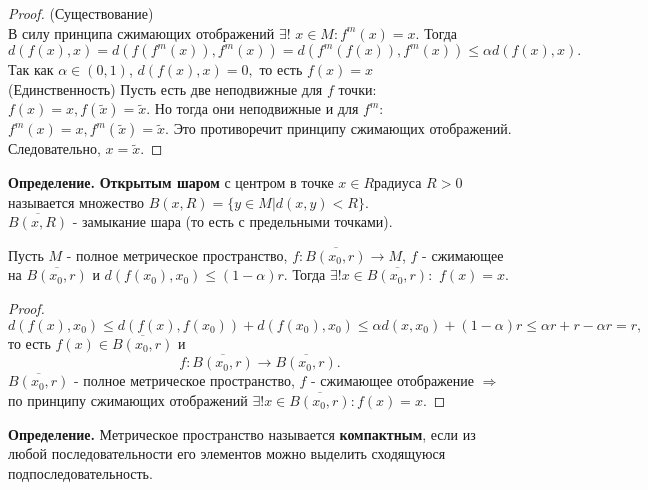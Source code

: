 \begin{proof}
    (Существование) \\
    В силу принципа сжимающих отображений $\exists!$ $x\in M:f^m(x)=x$. Тогда 
    \begin{equation*}
        d(f(x),x)=d(f(f^m(x)), f^m(x))=d(f^m(f(x)), f^m(x)) \leq \alpha d(f(x), x). 
    \end{equation*}
    Так как $\alpha \in (0,1)$, $d(f(x), x) = 0,$ то есть $f(x)=x$ \\
    (Единственность) Пусть есть две неподвижные для $f$ точки: $f(x) = x, f(\tilde{x}) = \tilde{x}$. Но тогда они неподвижные и для $f^m$: $f^m(x) = x, f^m(\tilde{x}) = \tilde{x}$. Это противоречит принципу
сжимающих отображений. Следовательно, $x = \tilde{x}$.
\end{proof}
\textbf{Определение.} \textbf{Открытым шаром} с центром в точке $x \in R $радиуса $R > 0$ называется множество $B(x, R) = \{y \in M | d(x,y) < R\}$. \\
$\overline{B(x, R)}$ - замыкание шара (то есть с предельными точками).

\begin{theorem}
    Пусть $M$ - полное метрическое пространство, $f:\overline{B(x_0, r)} \rightarrow M$, $f$ - сжимающее на $\overline{B(x_0, r)}$ и $d(f(x_0), x_0) \leq (1-\alpha)r$. Тогда $\exists! x \in \overline{B(x_0, r)}: $ $f(x)=x$.
\end{theorem}
\begin{proof}
    \begin{equation*}
        d(f(x), x_0) \leq d(f(x), f(x_0)) + d(f(x_0), x_0) \leq \alpha d(x, x_0) +(1-\alpha)r \leq \alpha r +r - \alpha r = r,
    \end{equation*}
    то есть $f(x) \in \overline{B(x_0, r)}$ и 
    \begin{equation*}
        f:\overline{B(x_0, r)} \rightarrow \overline{B(x_0, r)}.
    \end{equation*}
    $\overline{B(x_0, r)}$ -  полное метрическое пространство, $f$ - сжимающее отображение $\Rightarrow$ по принципу сжимающих отображений $\exists! x \in \overline{B(x_0, r)}: f(x) = x.$
\end{proof}

\textbf{Определение.} Метрическое пространство называется \textbf{компактным}, если из любой последовательности его элементов можно выделить сходящуюся подпоследовательность.

